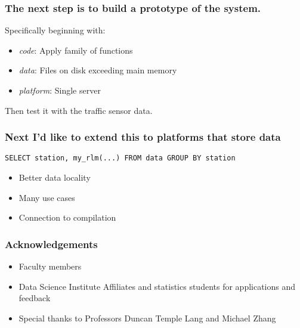 \documentclass{beamer}
\begin{document}
\begin{frame}

    \frametitle{The next step is to build a prototype of the system.}

    Specifically beginning with:

\begin{itemize}
    \item \emph{code}: Apply family of functions
    \item \emph{data}: Files on disk exceeding main memory
    \item \emph{platform}: Single server
\end{itemize}

Then test it with the traffic sensor data.

\end{frame}
\begin{frame}[fragile]

\frametitle{Next I'd like to extend this to platforms that store data}

\begin{verbatim}
SELECT station, my_rlm(...) FROM data GROUP BY station
\end{verbatim}


\begin{itemize}
    \item Better data locality
    \item Many use cases
    \item Connection to compilation
\end{itemize}

\end{frame}
\begin{frame}

    \frametitle{Acknowledgements}

\begin{itemize}
    \item Faculty members
    \item Data Science Institute Affiliates and statistics students for
        applications and feedback
    \item Special thanks to Professors Duncan Temple Lang and Michael Zhang
\end{itemize}

\end{frame}
\end{document}
